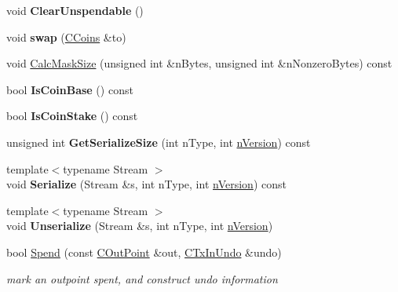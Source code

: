 \begin{DoxyCompactItemize}
\mbox{\label{class_c_coins_ad8b649abb32bdba255adec6dcfd57fc5}} 
void {\bfseries Clear\+Unspendable} ()
\item 
\mbox{\label{class_c_coins_a9581324a74e9500b3d2cad472c0a830f}} 
void {\bfseries swap} (\mbox{\hyperlink{class_c_coins}{C\+Coins}} \&to)
\item 
void \mbox{\hyperlink{class_c_coins_a7fc7a42f2b5d7cf7476bfe3e10141e18}{Calc\+Mask\+Size}} (unsigned int \&n\+Bytes, unsigned int \&n\+Nonzero\+Bytes) const
\item 
\mbox{\label{class_c_coins_a976c1374c3398e1ee23b1110f1663895}} 
bool {\bfseries Is\+Coin\+Base} () const
\item 
\mbox{\label{class_c_coins_ace818e478f11f06a6f9bebd7adb5933e}} 
bool {\bfseries Is\+Coin\+Stake} () const
\item 
\mbox{\label{class_c_coins_a63916fcdb2305c47e6360cf533c27438}} 
unsigned int {\bfseries Get\+Serialize\+Size} (int n\+Type, int \mbox{\hyperlink{class_c_coins_a96fea4ee8841e9ce32f60c2e7e3cf6b6}{n\+Version}}) const
\item 
\mbox{\label{class_c_coins_a7adea91f27b75755e8cfbc7c46fe3848}} 
{\footnotesize template$<$typename Stream $>$ }\\void {\bfseries Serialize} (Stream \&s, int n\+Type, int \mbox{\hyperlink{class_c_coins_a96fea4ee8841e9ce32f60c2e7e3cf6b6}{n\+Version}}) const
\item 
\mbox{\label{class_c_coins_adaa98cb6d8da3a4d573cd799ddd11051}} 
{\footnotesize template$<$typename Stream $>$ }\\void {\bfseries Unserialize} (Stream \&s, int n\+Type, int \mbox{\hyperlink{class_c_coins_a96fea4ee8841e9ce32f60c2e7e3cf6b6}{n\+Version}})
\item 
\mbox{\label{class_c_coins_a8d5fe8c1ab0c9558620448a19ecdb8b2}} 
bool \mbox{\hyperlink{class_c_coins_a8d5fe8c1ab0c9558620448a19ecdb8b2}{Spend}} (const \mbox{\hyperlink{class_c_out_point}{C\+Out\+Point}} \&out, \mbox{\hyperlink{class_c_tx_in_undo}{C\+Tx\+In\+Undo}} \&undo)
\begin{DoxyCompactList}\small\item\em mark an outpoint spent, and construct undo information \end{DoxyCompactList}\item 

\end{DoxyCompactItemize}
